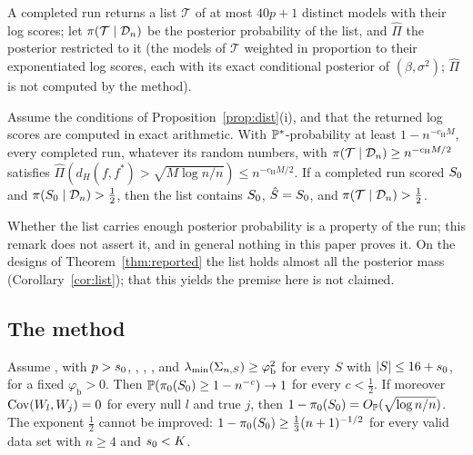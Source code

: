 A completed run returns a list $\mathcal T$ of at most $40p+1$ distinct models with their log scores; let
$\pi(\mathcal T\mid\Dn)$ be the posterior probability of the list, and $\hat\Pi$ the posterior restricted to it (the models
of $\mathcal T$ weighted in proportion to their exponentiated log scores, each with its exact conditional posterior of
$(\beta,\sigma^2)$; $\hat\Pi$ is not computed by the method).

\begin{remark}\label{cor:dist-output}
Assume the conditions of Proposition~\ref{prop:dist}(i), and that the returned log scores are computed in exact
arithmetic. With $\P^*$-probability at least $1-n^{-c_{\mathrm H}M}$, every completed run, whatever its random numbers, with
$\pi(\mathcal T\mid\Dn)\ge n^{-c_{\mathrm H}M/2}$ satisfies $\hat\Pi(d_H(f,f^*)>\sqrt{M\log n/n})\le n^{-c_{\mathrm H}M/2}$. If a
completed run scored $\Sz$ and $\pi(\Sz\mid\Dn)>\tfrac12$, then the list contains $\Sz$, $\Shat=\Sz$, and $\pi(\mathcal
T\mid\Dn)>\tfrac12$.
\end{remark}


Whether the list carries enough posterior probability is a property of the run; this remark does not assert it, and
in general nothing in this paper proves it. On the designs of Theorem~\ref{thm:reported} the list holds almost all the
posterior mass (Corollary~\ref{cor:list}); that this yields the premise here is not claimed.

\subsection{The method}\label{sec:supp-method}


\begin{theorem}\label{thm:start}
Assume ,  with $p>\sz$, , , , and $\lmin(\Sigma_{n,S})\ge\varphi_{\mathrm b}^2$ for every
$S$ with $\abs{S}\le16+\sz$, for a fixed $\varphi_{\mathrm b}>0$. Then $\P(\pi_0(\Sz)\ge1-n^{-c})\to1$ for every
$c<\tfrac12$. If moreover $\Cov(W_l,W_j)=0$ for every null $l$ and true $j$, then $1-\pi_0(\Sz)=\OP(\rn)$. The exponent
$\tfrac12$ cannot be improved: $1-\pi_0(\Sz)\ge\tfrac13(n+1)^{-1/2}$ for every valid data set with $n\ge4$ and $\sz<K$.
\end{theorem}

